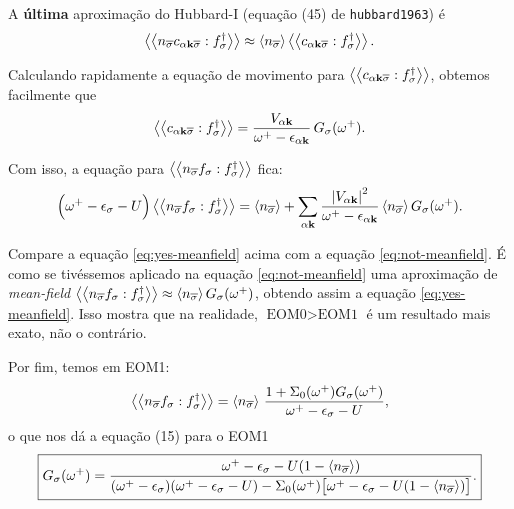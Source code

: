 \documentclass[a4paper,fleqn,12pt]{article}
\begin{document}
A \textbf{última} aproximação do Hubbard-I (equação (45) de \texttt{hubbard1963}) é
$$
\gf{n_{\cc{\sigma}} c_{\alpha \k \cc{\sigma}}}{f_\sigma^\dagger}
\approx
\ev{n_{\cc{\sigma}}} \gf{c_{\alpha \k \cc{\sigma}}}{f_\sigma^\dagger}.
$$

Calculando rapidamente a equação de movimento para $\gf{c_{\alpha \k \cc{\sigma}}}{f_\sigma^\dagger}$, obtemos facilmente que
$$
\gf{c_{\alpha \k \cc{\sigma}}}{f_\sigma^\dagger} =
\frac{V_{\alpha \k}}{\omega^+ - \eps_{\alpha \k}} \, G_\sigma(\omega^+).
$$

Com isso, a equação para $\gf{n_{\cc{\sigma}} f_\sigma}{f_\sigma^\dagger}$ fica:
\begin{equation} \label{eq:yes-meanfield}
\Big(
\omega^+ - \eps_\sigma - U
\Big) \gf{n_{\cc{\sigma}} f_\sigma}{f_\sigma^\dagger} =
\ev{n_{\cc{\sigma}}} +
\sum_{\alpha \k} \frac{\abs{V_{\alpha \k}}^2}
{\omega^+ - \eps_{\alpha \k}} \ev{n_{\cc{\sigma}}} G_\sigma(\omega^+).
\end{equation}

Compare a equação \ref{eq:yes-meanfield} acima com a equação \ref{eq:not-meanfield}. É como se tivéssemos aplicado na equação \ref{eq:not-meanfield} uma aproximação de \textit{mean-field} $\gf{n_{\cc{\sigma}} f_\sigma}{f_\sigma^\dagger} \approx \ev{n_{\cc{\sigma}}} G_\sigma(\omega^+)$, obtendo assim a equação \ref{eq:yes-meanfield}. Isso mostra que na realidade, $\text{EOM0} > \text{EOM1}$ é um resultado mais exato, não o contrário.

Por fim, temos em EOM1:
$$
\gf{n_{\cc{\sigma}} f_\sigma}{f_\sigma^\dagger} =
\ev{n_{\cc{\sigma}}} \,
\frac{1 + \Sigma_0(\omega^+) G_\sigma(\omega^+)}{\omega^+ - \eps_\sigma - U},
$$
o que nos dá a equação (15) para o EOM1
$$
\boxed{
G_\sigma(\omega^+) =
\frac{\omega^+ - \eps_\sigma - U(1-\ev{n_{\cc{\sigma}}})}
{(\omega^+ - \eps_\sigma)(\omega^+ - \eps_\sigma - U) -
\Sigma_0(\omega^+)
\big[
\omega^+ - \eps_\sigma - U(1-\ev{n_{\cc{\sigma}}})
\big]
}. }
$$
\end{document}
